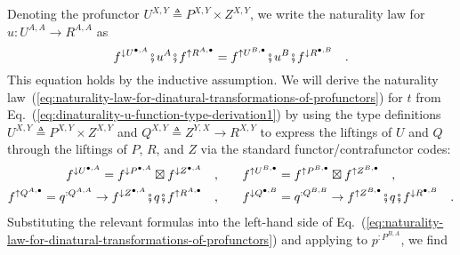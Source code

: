 Denoting the profunctor $U^{X,Y}\triangleq P^{X,Y}\times Z^{X,Y}$,
we write the naturality law for $u:U^{A,A}\rightarrow R^{A,A}$ as
\begin{equation}
f^{\downarrow U^{\bullet,A}}\bef u^{A}\bef f^{\uparrow R^{A,\bullet}}=f^{\uparrow U^{B,\bullet}}\bef u^{B}\bef f^{\downarrow R^{\bullet,B}}\quad.\label{eq:dinaturality-u-function-type-derivation1}
\end{equation}
This equation holds by the inductive assumption. We will derive the
naturality law~(\ref{eq:naturality-law-for-dinatural-transformations-of-profunctors})
for $t$ from Eq.~(\ref{eq:dinaturality-u-function-type-derivation1})
by using the type definitions $U^{X,Y}\triangleq P^{X,Y}\times Z^{X,Y}$
and $Q^{X,Y}\triangleq Z^{Y,X}\rightarrow R^{X,Y}$ to express the
liftings of $U$ and $Q$ through the liftings of $P$, $R$, and
$Z$ via the standard functor/contrafunctor codes:
\begin{align}
f^{\downarrow U^{\bullet,A}}=f^{\downarrow P^{\bullet,A}}\boxtimes f^{\downarrow Z^{\bullet,A}}\quad, & \quad\quad f^{\uparrow U^{B,\bullet}}=f^{\uparrow P^{B,\bullet}}\boxtimes f^{\uparrow Z^{B,\bullet}}\quad,\label{eq:dinaturality-u-function-type-derivation2}\\
f^{\uparrow Q^{A,\bullet}}=q^{:Q^{A,A}}\rightarrow f^{\downarrow Z^{\bullet,A}}\bef q\bef f^{\uparrow R^{A,\bullet}}\quad, & \quad\quad f^{\downarrow Q^{\bullet,B}}=q^{:Q^{B,B}}\rightarrow f^{\uparrow Z^{B,\bullet}}\bef q\bef f^{\downarrow R^{\bullet,B}}\quad.\label{eq:dinaturality-u-function-type-derivation3}
\end{align}
Substituting the relevant formulas into the left-hand side of Eq.~(\ref{eq:naturality-law-for-dinatural-transformations-of-profunctors})
and applying to $p^{:P^{B,A}}$, we find
